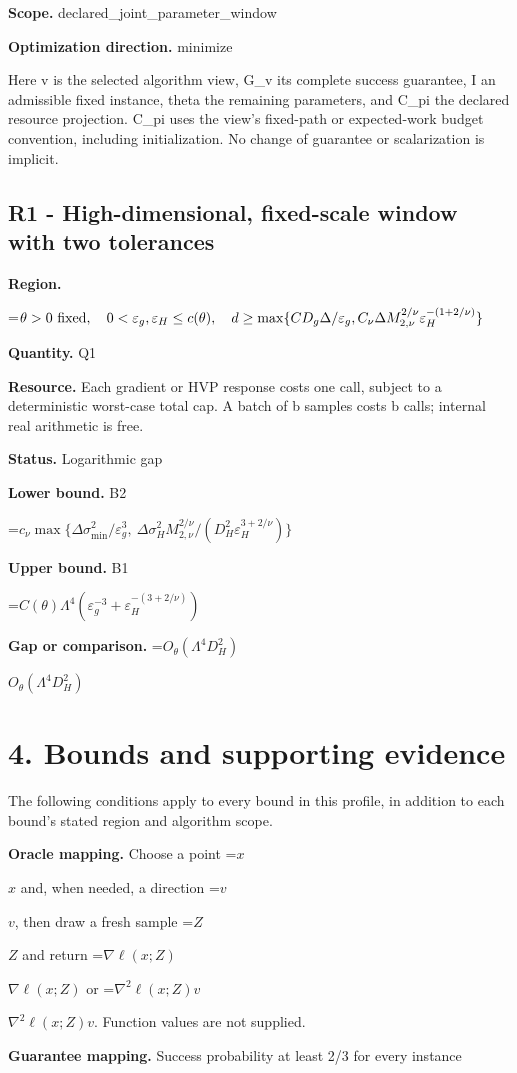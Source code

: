 \documentclass[10pt,a4paper]{article}
\newcommand{\AtlasMath}[1]{\par\begingroup\centering\setbox0=\hbox{$\displaystyle #1$}\ifdim\wd0>1.4\linewidth\typeout{ATLAS WIDE FORMULA: \the\wd0}\fi\ifdim\wd0>\linewidth\resizebox{\linewidth}{!}{\box0}\else\box0\fi\par\endgroup}
\newcommand{\AtlasInlineMath}[1]{\begingroup\setbox0=\hbox{$#1$}\ifdim\wd0>.4\linewidth\endgroup\AtlasMath{#1}\else\endgroup$#1$\fi}
\begin{document}
\textbf{Scope.} declared\_joint\_parameter\_window

\textbf{Optimization direction.} minimize

Here v is the selected algorithm view, G\_v its complete success guarantee, I an admissible fixed instance, theta the remaining parameters, and C\_pi the declared resource projection. C\_pi uses the view's fixed-path or expected-work budget convention, including initialization. No change of guarantee or scalarization is implicit.

\subsection{R1 - High-dimensional, fixed-scale window with two tolerances}
\textbf{Region.} 
\AtlasMath{\theta>0\ {\rm fixed},\quad0<\varepsilon_g,\varepsilon_H\le c(\theta),\quad d\ge\max\{C D_g\Delta/\varepsilon_g,C_\nu\Delta M_{2,\nu}^{2/\nu}\varepsilon_H^{-(1+2/\nu)}\}}


\textbf{Quantity.} Q1

\textbf{Resource.} Each gradient or HVP response costs one call, subject to a deterministic worst-case total cap. A batch of b samples costs b calls; internal real arithmetic is free.

\textbf{Status.} Logarithmic gap

\textbf{Lower bound.} B2

\AtlasMath{c_\nu\max\{\Delta\sigma_{\min}^2/\varepsilon_g^3,\ \Delta\sigma_H^2M_{2,\nu}^{2/\nu}/(D_H^2\varepsilon_H^{3+2/\nu})\}}
\textbf{Upper bound.} B1

\AtlasMath{C(\theta)\Lambda^4(\varepsilon_g^{-3}+\varepsilon_H^{-(3+2/\nu)})}
\textbf{Gap or comparison.} \AtlasInlineMath{O_\theta(\Lambda^4D_H^2)}

\section{4. Bounds and supporting evidence}
The following conditions apply to every bound in this profile, in addition to each bound's stated region and algorithm scope.

\textbf{Oracle mapping.} Choose a point \AtlasInlineMath{x} and, when needed, a direction \AtlasInlineMath{v}, then draw a fresh sample \AtlasInlineMath{Z} and return \AtlasInlineMath{\nabla\ell(x;Z)} or \AtlasInlineMath{\nabla^2\ell(x;Z)v}. Function values are not supplied.

\textbf{Guarantee mapping.} Success probability at least 2/3 for every instance
\end{document}
